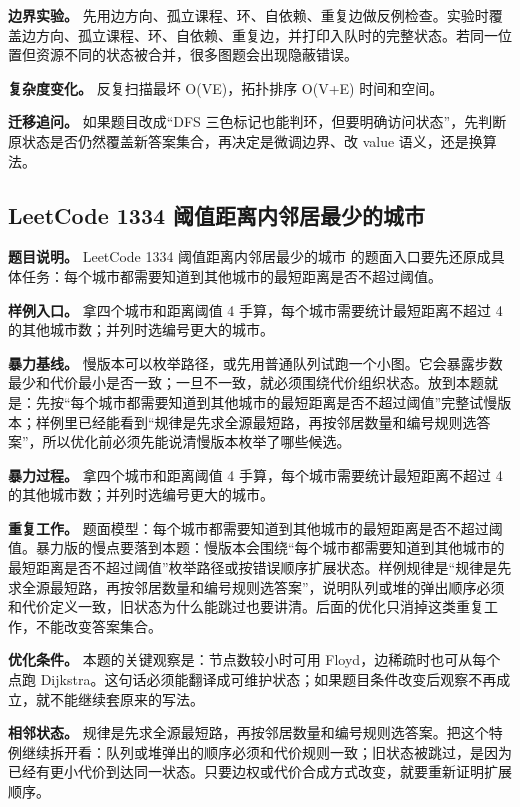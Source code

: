 \textbf{边界实验。} 先用边方向、孤立课程、环、自依赖、重复边做反例检查。实验时覆盖边方向、孤立课程、环、自依赖、重复边，并打印入队时的完整状态。若同一位置但资源不同的状态被合并，很多图题会出现隐蔽错误。

\textbf{复杂度变化。} 反复扫描最坏 O(VE)，拓扑排序 O(V+E) 时间和空间。

\textbf{迁移追问。} 如果题目改成“DFS 三色标记也能判环，但要明确访问状态”，先判断原状态是否仍然覆盖新答案集合，再决定是微调边界、改 value 语义，还是换算法。

\subsection{LeetCode 1334 阈值距离内邻居最少的城市}

\textbf{题目说明。} LeetCode 1334 阈值距离内邻居最少的城市 的题面入口要先还原成具体任务：每个城市都需要知道到其他城市的最短距离是否不超过阈值。

\textbf{样例入口。} 拿四个城市和距离阈值 4 手算，每个城市需要统计最短距离不超过 4 的其他城市数；并列时选编号更大的城市。

\textbf{暴力基线。} 慢版本可以枚举路径，或先用普通队列试跑一个小图。它会暴露步数最少和代价最小是否一致；一旦不一致，就必须围绕代价组织状态。放到本题就是：先按“每个城市都需要知道到其他城市的最短距离是否不超过阈值”完整试慢版本；样例里已经能看到“规律是先求全源最短路，再按邻居数量和编号规则选答案”，所以优化前必须先能说清慢版本枚举了哪些候选。

\textbf{暴力过程。} 拿四个城市和距离阈值 4 手算，每个城市需要统计最短距离不超过 4 的其他城市数；并列时选编号更大的城市。

\textbf{重复工作。} 题面模型：每个城市都需要知道到其他城市的最短距离是否不超过阈值。暴力版的慢点要落到本题：慢版本会围绕“每个城市都需要知道到其他城市的最短距离是否不超过阈值”枚举路径或按错误顺序扩展状态。样例规律是“规律是先求全源最短路，再按邻居数量和编号规则选答案”，说明队列或堆的弹出顺序必须和代价定义一致，旧状态为什么能跳过也要讲清。后面的优化只消掉这类重复工作，不能改变答案集合。

\textbf{优化条件。} 本题的关键观察是：节点数较小时可用 Floyd，边稀疏时也可从每个点跑 Dijkstra。这句话必须能翻译成可维护状态；如果题目条件改变后观察不再成立，就不能继续套原来的写法。

\textbf{相邻状态。} 规律是先求全源最短路，再按邻居数量和编号规则选答案。把这个特例继续拆开看：队列或堆弹出的顺序必须和代价规则一致；旧状态被跳过，是因为已经有更小代价到达同一状态。只要边权或代价合成方式改变，就要重新证明扩展顺序。

